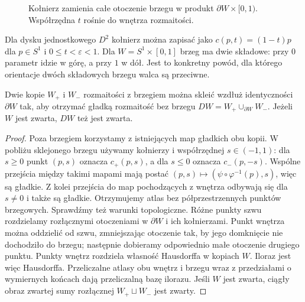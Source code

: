 \begin{figure}[htbp]
\centering
{}
\caption{Kołnierz zamienia całe otoczenie brzegu
w produkt $\partial W\times[0,1)$.
Współrzędna $t$ rośnie do wnętrza rozmaitości.}
\label{fig:kolnierz-15}
\end{figure}

\begin{przyklad}
Dla dysku jednostkowego $D^2$
kołnierz można zapisać jako
$c(p,t)=(1-t)p$ dla $p\in S^1$
i $0\leq t<\varepsilon<1$.
Dla $W=S^1\times[0,1]$ brzeg
ma dwie składowe: przy $0$
parametr idzie w górę, a przy
$1$ w dół. Jest to konkretny
powód, dla którego orientacje
dwóch składowych brzegu walca
są przeciwne.
\end{przyklad}

\begin{wniosek}
\label{cor:podwojenie-15}
Dwie kopie $W_+$ i $W_-$ rozmaitości
z brzegiem można skleić wzdłuż
identyczności $\partial W$ tak,
aby otrzymać gładką rozmaitość
bez brzegu
$DW=W_+\cup_{\partial W}W_-$.
Jeżeli $W$ jest zwarta, $DW$
też jest zwarta.
\end{wniosek}
\begin{proof}
Poza brzegiem korzystamy z
istniejących map gładkich obu kopii.
W pobliżu sklejonego brzegu
używamy kołnierzy i współrzędnej
$s\in(-1,1)$: dla $s\geq0$
punkt $(p,s)$ oznacza $c_+(p,s)$,
a dla $s\leq0$ oznacza
$c_-(p,-s)$. Wspólne przejścia
między takimi mapami mają postać
$(p,s)\mapsto(\psi\circ\varphi^{-1}(p),s)$,
więc są gładkie. Z kolei przejścia
do map pochodzących z wnętrza
odbywają się dla $s\ne0$ i także
są gładkie. Otrzymujemy atlas
bez półprzestrzennych punktów
brzegowych. Sprawdźmy też warunki topologiczne.
Różne punkty szwu rozdzielamy rozłącznymi otoczeniami
w $\partial W$ i ich kołnierzami. Punkt wnętrza
można oddzielić od szwu, zmniejszając otoczenie
tak, by jego domknięcie nie dochodziło do brzegu;
następnie dobieramy odpowiednio małe otoczenie
drugiego punktu. Punkty wnętrz rozdziela własność
Hausdorffa w kopiach $W$. Iloraz jest więc Hausdorffa.
Przeliczalne atlasy obu wnętrz i brzegu wraz
z przedziałami o wymiernych końcach dają przeliczalną
bazę ilorazu. Jeśli $W$ jest zwarta, ciągły obraz
zwartej sumy rozłącznej $W_+\sqcup W_-$ jest zwarty.
\end{proof}

